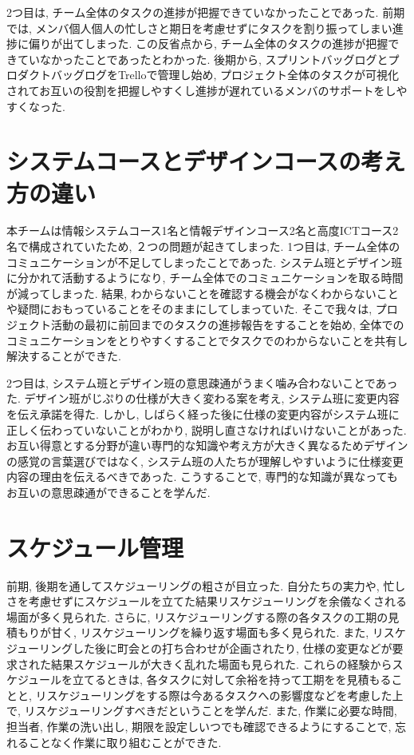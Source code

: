 2つ目は, チーム全体のタスクの進捗が把握できていなかったことであった. 前期では, メンバ個人個人の忙しさと期日を考慮せずにタスクを割り振ってしまい進捗に偏りが出てしまった.
この反省点から, チーム全体のタスクの進捗が把握できていなかったことであったとわかった. 後期から, スプリントバッグログとプロダクトバッグログをTrelloで管理し始め,
プロジェクト全体のタスクが可視化されてお互いの役割を把握しやすくし進捗が遅れているメンバのサポートをしやすくなった.

\section{システムコースとデザインコースの考え方の違い}
本チームは情報システムコース1名と情報デザインコース2名と高度ICTコース2名で構成されていたため, ２つの問題が起きてしまった.
1つ目は, チーム全体のコミュニケーションが不足してしまったことであった. システム班とデザイン班に分かれて活動するようになり, チーム全体でのコミュニケーションを取る時間が減ってしまった.
結果, わからないことを確認する機会がなくわからないことや疑問におもっていることをそのままにしてしまっていた. そこで我々は, プロジェクト活動の最初に前回までのタスクの進捗報告をすることを始め,
全体でのコミュニケーションをとりやすくすることでタスクでのわからないことを共有し解決することができた.

2つ目は, システム班とデザイン班の意思疎通がうまく噛み合わないことであった.
デザイン班がじぷりの仕様が大きく変わる案を考え, システム班に変更内容を伝え承諾を得た. しかし, しばらく経った後に仕様の変更内容がシステム班に正しく伝わっていないことがわかり,
説明し直さなければいけないことがあった. お互い得意とする分野が違い専門的な知識や考え方が大きく異なるためデザインの感覚の言葉選びではなく,
システム班の人たちが理解しやすいように仕様変更内容の理由を伝えるべきであった. こうすることで, 専門的な知識が異なってもお互いの意思疎通ができることを学んだ.

\section{スケジュール管理}
前期, 後期を通してスケジューリングの粗さが目立った. 自分たちの実力や, 忙しさを考慮せずにスケジュールを立てた結果リスケジューリングを余儀なくされる場面が多く見られた. さらに, リスケジューリングする際の各タスクの工期の見積もりが甘く, リスケジューリングを繰り返す場面も多く見られた. また, リスケジューリングした後に町会との打ち合わせが企画されたり, 仕様の変更などが要求された結果スケジュールが大きく乱れた場面も見られた.
これらの経験からスケジュールを立てるときは, 各タスクに対して余裕を持って工期をを見積もることと, リスケジューリングをする際は今あるタスクへの影響度などを考慮した上で, リスケジューリングすべきだということを学んだ. また, 作業に必要な時間, 担当者, 作業の洗い出し, 期限を設定しいつでも確認できるようにすることで, 忘れることなく作業に取り組むことができた.
